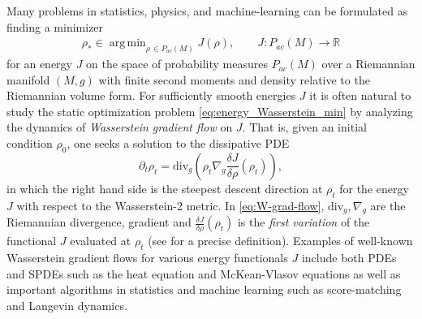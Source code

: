 \documentclass[reqno,11pt,letterpaper]{amsart}
\theoremstyle{plain}
\theoremstyle{definition}
\theoremstyle{remark}
\DeclareMathOperator*{\argmin}{arg\,min}
\newcommand{\lr}[1]{\left(#1\right)}
\begin{document}
Many problems in statistics, physics, and machine-learning can be formulated as finding a minimizer 
\begin{align}\label{eq:energy_Wasserstein_min}
\rho_* \in \argmin_{\rho\, \in P_{ac}(M)} J(\rho),\qquad J: P_{ac}(M) \to \mathbb{R}
\end{align}
for an energy $J$ on the space of probability measures $P_{ac}(M)$ over a Riemannian manifold $(M,g)$ with finite second moments and density relative to the Riemannian volume form. For sufficiently smooth energies $J$ it is often natural to study the static optimization problem \eqref{eq:energy_Wasserstein_min} by analyzing the dynamics of \emph{Wasserstein gradient flow} on $J$. That is, given an initial condition $\rho_0$, one seeks a solution to the dissipative PDE
\begin{equation}\label{eq:W-grad-flow}
\partial_t \rho_t  = \mathrm{div}_g\lr{\rho_t \nabla_g \frac{\delta J}{\delta \rho}(\rho_t)},   
\end{equation}
in which the right hand side is the steepest descent direction at $\rho_t$ for the energy $J$ with respect to the Wasserstein-2 metric. In \eqref{eq:W-grad-flow}, $\mathrm{div}_g, \nabla_g$ are the Riemannian divergence, gradient and $\frac{\delta J}{\delta \rho}(\rho_t)$ is the \textit{first variation} of the functional $J$ evaluated at $\rho_t$ (see \cite{calcvar} for a precise definition). Examples of well-known Wasserstein gradient flows for various energy functionals $J$ include both PDEs and SPDEs such as the heat equation and McKean-Vlasov equations as well as important algorithms in statistics and machine learning such as score-matching and Langevin dynamics. 
\end{document}
